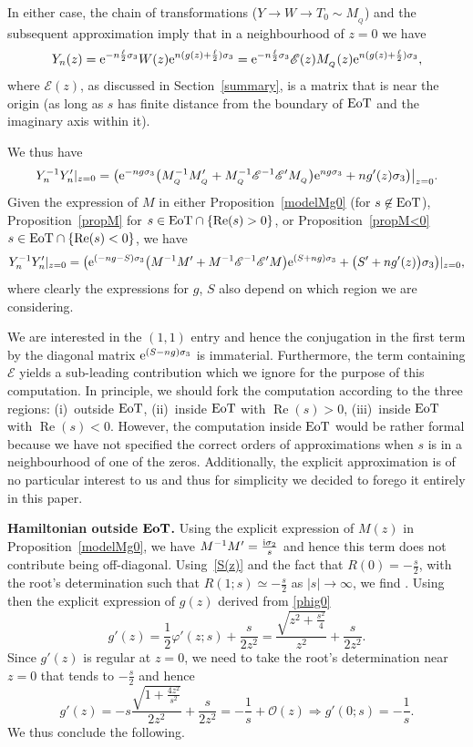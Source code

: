 \documentclass[10pt,a4paper]{amsart}
\numberwithin{equation}{section}
\theoremstyle{definition}
\def \scr{\mathscr}
\def \1{\mathbf 1}
\def\s{\sigma}
\def \Re{\operatorname{Re} }
\begin{document}
 In either case, the chain of transformations ($Y\to W\to T_0 \sim M_{_Q}$) and the subsequent approximation imply that in a neighbourhood of $z=0$ we have
 \[
 Y_n(z) = {\rm e}^{-n\frac \ell 2\s_3} W(z){\rm e}^{n(g(z) + \frac \ell 2)\s_3}=
 {\rm e}^{-n\frac \ell 2\s_3} \scr E (z) M_{_Q} (z){\rm e}^{n(g(z) + \frac \ell 2)\s_3},
 \]
 where $\scr E(z)$, as discussed in Section~\ref{summary}, is a matrix that is \smash{$\1+ \mathcal O\bigl(\frac 1{n \vartheta(G- \frac {\tau+1}2)^2} \bigr)$} near the origin (as long as $s$ has finite distance from the boundary of ${\rm EoT}$ and the imaginary axis within it).

We thus have
\[
Y_n^{-1} Y_n' |_{z=0} =\bigl({\rm e}^{-ng\s_3} \bigl(M_{_Q}^{-1} M_{_Q}' + M^{-1}_{_Q} \scr E^{-1} \scr E' M_{_Q} \bigr) {\rm e}^{ng\s_3}+ n g'(z) \s_3 \bigr)\big|_{z=0}.
\]
Given the expression of $M$ in either Proposition~\ref{modelMg0} (for $s\not\in {\rm EoT}$), Proposition~\ref{propM} for $s\in {\rm EoT}\cap\{\Re (s)> 0\}$, or Proposition~\ref{propM<0} $s\in {\rm EoT}\cap\{\Re (s)< 0\}$, we have
 \[
Y_n^{-1} Y_n' |_{z=0} =\bigl( {\rm e}^{(-ng-S)\s_3} \bigl(M^{-1} M' + M^{-1} \scr E^{-1} \scr E' M\bigr){\rm e}^{(S+ ng)\s_3} +\bigl(S'+ n g'(z)\bigr) \s_3 \bigr)|_{z=0},
\]
where clearly the expressions for $g$, $S$ also depend on which region we are considering.

We are interested in the $(1,1)$ entry and hence the conjugation in the first term by the diagonal matrix ${\rm e}^{(S-ng)\s_3}$ is immaterial. Furthermore, the term containing $\scr E$ yields a sub-leading contribution which we ignore for the purpose of this computation.
In principle, we should fork the computation according to the three regions: (i)~outside ${\rm EoT}$, (ii)~inside ${\rm EoT}$ with $\Re (s)>0$, (iii)~inside ${\rm EoT}$ with $\Re(s)<0$. However, the computation inside ${\rm EoT}$ would be rather formal because we have not specified the correct orders of approximations when $s$ is in a neighbourhood of one of the zeros.
Additionally, the explicit approximation is of no particular interest to us and thus for simplicity we decided to forego it entirely in this paper.

{\bf Hamiltonian outside $\boldsymbol{{\rm EoT}}$.}
 Using the explicit expression of $M(z)$ in Proposition~\ref{modelMg0}, we have
 $ M^{-1}M' = \frac {{\rm i}\s_2}s $
 and hence this term does not contribute being off-diagonal.
 Using~\eqref{S(z)} and the fact that $R(0)=-\frac s 2$,  with the root's determination such that $R(1;s)\simeq -\frac s 2$ as $|s|\to\infty$, we find
.
 Using then the explicit expression of $g(z)$ derived from \eqref{phig0}
 \[
 g'(z) = \frac 1 2 \varphi'(z;s) + \frac{s}{2z^2} = \frac{\sqrt{z^2+\frac {s^2}4}}{z^2} + \frac s {2z^2}.
 \]
 Since $g'(z)$ is regular at $z=0$, we need to take the root's determination near $z=0$ that tends to $-\frac s 2$ and hence
 \[
 g'(z) =-s \frac{\sqrt{1+\frac {4z^2}{s^2} }}{2z^2} + \frac s {2z^2} = -\frac 1 s + \mathcal O(z) \Rightarrow g'(0;s) = -\frac 1 s.
 \]
 We thus conclude the following.
\end{document}
